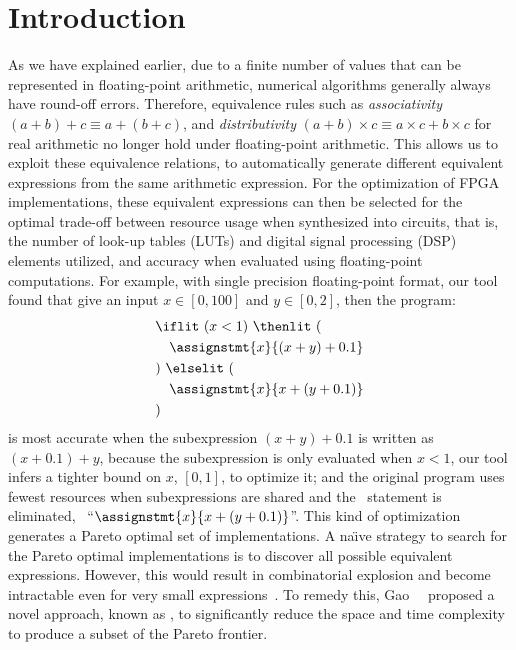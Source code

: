 \section{Introduction}


As we have explained earlier, due to a finite number of values that
can be represented in floating-point arithmetic, numerical algorithms
generally always have round-off errors.  Therefore, equivalence rules
such as \emph{associativity} $(a + b) + c \equiv a + (b + c)$, and
\emph{distributivity} $(a + b) \times c \equiv a \times c + b \times c$
for real arithmetic no longer hold under floating-point arithmetic.  This
allows us to exploit these equivalence relations, to automatically generate
different equivalent expressions from the same arithmetic expression.  For the
optimization of FPGA implementations, these equivalent expressions can then
be selected for the optimal trade-off between resource usage when synthesized
into circuits, that is, the number of look-up tables (LUTs) and digital
signal processing (DSP) elements utilized, and accuracy when evaluated using
floating-point computations.  For example, with single precision floating-point
format, our tool found that give an input $x \in [0, 100]$ and $y \in [0, 2]$,
then the program:
\begin{equation}
    \begin{aligned}
        & \iflit~(x < 1)~\thenlit~( \\
        & \quad \assignstmt{x}{(x + y) + 0.1} \\
        & )~\elselit~( \\
        & \quad \assignstmt{x}{x + (y + 0.1)} \\
        & )
    \end{aligned}
\end{equation}
is most accurate when the subexpression $(x + y) + 0.1$ is written as
$(x + 0.1) + y$, because the subexpression is only evaluated when $x <
1$, our tool infers a tighter bound on $x$, $[0, 1]$, to optimize it;
and the original program uses fewest resources when subexpressions are
shared and the \if~statement is eliminated, \ie~``$\assignstmt{x}{x + (y
+ 0.1)}$''.  This kind of optimization generates a Pareto optimal set of
implementations.  A na{\"\i}ve strategy to search for the Pareto optimal
implementations is to discover all possible equivalent expressions.  However,
this would result in combinatorial explosion and become intractable even
for very small expressions~\cite{soap,ioualalen,mouilleron}.  To remedy
this, Gao~\etal~\cite{soap} proposed a novel approach, known as \soap, to
significantly reduce the space and time complexity to produce a subset of the
Pareto frontier.


